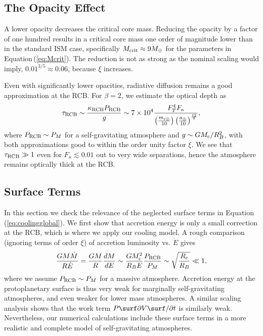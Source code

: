 \documentclass[apj, numberedappendix]{emulateapj}
\newcommand{\p}{\partial}
\newcommand{\Eq}[1]{Equation\,(\ref{#1})}
\newcommand{\co}{_{\rm c}}
\newcommand{\cb}{_{\rm RCB}}
\newcommand{\mc}{m_{\rm c \oplus}}
\newcommand{\au}{a_\oplus}
\begin{document}
\subsection{The Opacity Effect}
\label{opacityan}
A  lower opacity  decreases the critical core mass.  Reducing the opacity by a factor of one hundred results in a critical core mass one order of magnitude lower than in the standard ISM case, specifically  $M_{\rm{crit}} \approx9 M_\oplus$ for the parameters in \Eq{eq:Mcrit}.  The reduction is not  as strong as the nominal scaling would imply, $0.01^{3/5} \approx 0.06$, because $\xi$ increases.

Even with significantly lower opacities, radiative diffusion remains a good approximation at the RCB. For $\beta = 2$, we estimate the optical depth as
\begin{equation}
\tau\cb \sim {\kappa\cb P\cb \over g} \sim 7 \times 10^4 {F_T^4 F_\kappa \over \left(\mc \over 10 \right) \left(\au \over 10\right)^{12 \over 7}}, 
\end{equation} 
where $P\cb \sim P_M$ for a self-gravitating atmosphere and $g \sim G M\co/R_B^2$, with both approximations good to within the order unity factor $\xi$.  We see that $\tau\cb \gg 1$ even for $F_\kappa \lesssim 0.01$ out to very wide separations, hence the atmosphere remains optically thick at the RCB.


\subsection{Surface Terms}
\label{surfterms}
In this section we check the relevance of the neglected surface terms in \Eq{eq:coolingglobal}.  We first show that accretion energy is only a small correction at the RCB, which is where we apply our cooling model. A rough comparison (ignoring terms of order $\xi$) of  accretion luminosity vs. $\dot{E}$ gives
\begin{equation}
{G M \dot{M} \over R \dot{E}} = {G M  \over R}{dM \over dE} \sim {G M\co^2 \over R_B E}{P\cb \over P_M} \sim \sqrt{R\co \over R_B} \ll 1,
\end{equation} 
where we assume $P\cb \sim P_M$  for a massive atmosphere.  Accretion energy at the protoplanetary surface is thus very weak for marginally self-gravitating atmospheres, and even weaker for lower mass atmospheres.  A similar scaling analysis shows that the work term $P\surf \p V\surf/\p t$ is similarly weak.  Nevertheless, our numerical calculations include these surface terms in a more realistic and complete model of self-gravitating atmospheres.
\end{document}
